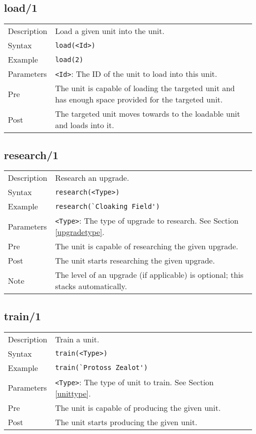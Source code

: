 \subsection{load/1}
\begin{tabularx}{\textwidth}{lX}
 Description & Load a given unit into the unit. \\
 Syntax & \verb|load(<Id>)| \\
 Example & \verb|load(2)| \\
 Parameters & \verb|<Id>|: The ID of the unit to load into this unit. \\
 Pre & The unit is capable of loading the targeted unit and has enough space provided for the targeted unit. \\
 Post & The targeted unit moves towards to the loadable unit and loads into it.
\end{tabularx}

\subsection{research/1}
\begin{tabularx}{\textwidth}{lX}
 Description & Research an upgrade. \\
 Syntax & \verb|research(<Type>)| \\
 Example & \verb|research(`Cloaking Field')| \\
 Parameters & \verb|<Type>|: The type of upgrade to research. See Section \ref{upgradetype}. \\
 Pre & The unit is capable of researching the given upgrade. \\
 Post & The unit starts researching the given upgrade. \\
 Note & The level of an upgrade (if applicable) is optional; this stacks automatically.
\end{tabularx}

\subsection{train/1}
\begin{tabularx}{\textwidth}{lX}
 Description & Train a unit. \\
 Syntax & \verb|train(<Type>)| \\
 Example & \verb|train(`Protoss Zealot')| \\
 Parameters & \verb|<Type>|: The type of unit to train. See Section \ref{unittype}. \\
 Pre & The unit is capable of producing the given unit. \\
 Post & The unit starts producing the given unit.
\end{tabularx}

